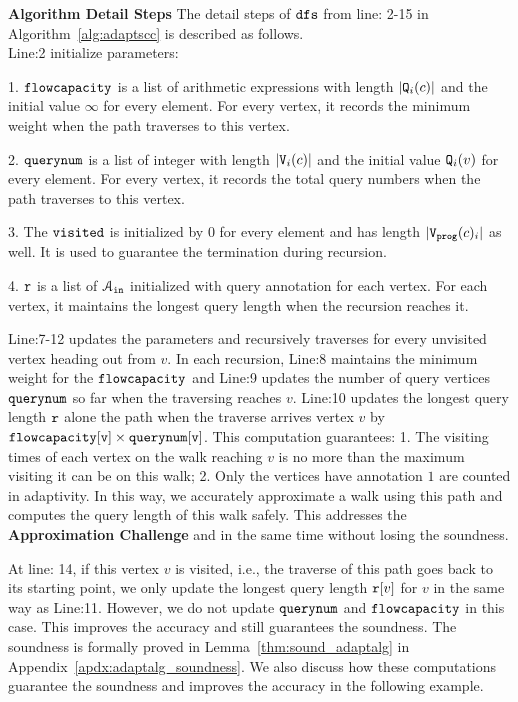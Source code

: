 \textbf{Algorithm Detail Steps}
The detail steps of $\mathtt{dfs}$
from line: 2-15 in Algorithm~\ref{alg:adaptscc}
is described as follows.
 \\
Line:2 initialize parameters:

1. 
 $\mathtt{flowcapacity}$ is a list of arithmetic expressions with length $|\mathtt{Q}_i(c)|$ and the initial value $\infty$ for every element. For every vertex, it records the minimum weight when the path traverses to this vertex.

2. $\mathtt{querynum}$ is a list of integer with length $|\mathtt{V}_i(c)|$ and the initial value $\mathtt{Q}_i(v)$ for every element. 
For every vertex, 
it records the total query numbers when the path traverses to this vertex.

3. The $\mathtt{visited}$ is initialized by $0$ for every element and has length $|\mathtt{{V_{prog}}}(c)_i|$ as well. It is used to guarantee the termination during recursion.

4. $\mathtt{r}$ is a list of $\mathcal{A}_{\mathtt{in}}$ initialized with query annotation for each vertex. For each vertex, it maintains the longest query length when the recursion reaches it.

Line:7-12 updates the parameters and recursively traverses for every unvisited vertex heading out from $v$.
In each recursion,
Line:8 maintains the minimum weight for the 
$\mathtt{flowcapacity}$ and Line:9 updates the 
number of query vertices 
$\mathtt{querynum}$ so far when the traversing reaches $v$.
Line:10
updates the longest query length $\mathtt{r}$
alone the path when the traverse arrives vertex $v$ by $\mathtt{flowcapacity[v] \times querynum[v]}$.
This computation guarantees: 
1. The visiting times of each vertex on the walk reaching $v$ is no more than 
the maximum visiting it can be on this walk;
2. Only the vertices have annotation $1$ are counted in adaptivity.
In this way, we accurately approximate a walk using this path and computes the query length of this walk safely.
This addresses the \textbf{Approximation Challenge} and in the same time without losing the soundness.

At line: 14, if this vertex $v$ is visited, 
i.e., the traverse of this path goes back to its starting point,
we only update the longest query length $\mathtt{r}[v]$ for $v$ in the same way as Line:11.
However, we do not update
$\mathtt{querynum}$ and $\mathtt{flowcapacity}$ in this case.
This improves the accuracy and still guarantees the soundness. The soundness is formally proved in Lemma~\ref{thm:sound_adaptalg} in Appendix~\ref{apdx:adaptalg_soundness}. We also discuss how these computations guarantee the soundness and improves the accuracy in the following example.

